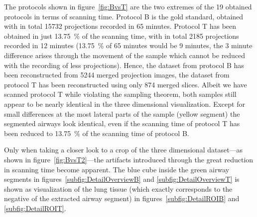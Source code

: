 The protocols shown in figure~\ref{fig:BvsT} are the two extremes of the 19 obtained protocols in terms of scanning time. \cbstart Protocol B is the gold standard, obtained with in total 15732 projections recorded in 65 minutes. Protocol T has been obtained in just \SI{13.75}{\percent} of the scanning time, with in total 2185 projections recorded in 12 minutes (\SI{13.75}{\percent} of 65 minutes would be 9 minutes, the 3 minute difference arises through the movement of the sample which cannot be reduced with the recording of less projections). Hence, the dataset from protocol B has been reconstructed from 5244 merged projection images, the dataset from protocol T has been reconstructed using only 874 merged slices. Albeit we have scanned protocol T while violating the sampling theorem, both samples still appear to be nearly identical in the three dimensional visualization. Except for small differences at the most lateral parts of the sample (yellow segment) the segmented airways look identical, even if the scanning time of protocol T has been reduced to \SI{13.75}{\percent} of the scanning time of protocol B.

Only when taking a closer look to a crop of the three dimensional dataset---as shown in figure~\ref{fig:BvsT2}---the artifacts introduced through the great reduction in scanning time become apparent. The blue cube inside the green airway segments in figures~\ref{subfig:DetailOverviewB} and \ref{subfig:DetailOverviewT} is shown as visualization of the lung tissue (which exactly corresponds to the negative of the extracted airway segment) in figures~\ref{subfig:DetailROIB} and \ref{subfig:DetailROIT}.
\cbend
{}

